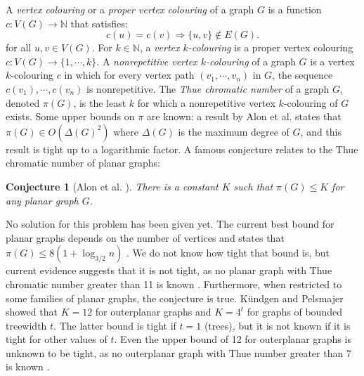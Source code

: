 \documentclass{patmorin}
\newcommand{\naturals}{\mathbb{N}}
\newtheorem{conjecture}[theorem]{Conjecture}
\begin{document}
A \emph{vertex colouring} or a \emph{proper vertex colouring} of a graph $G$ is a function $c: V(G) \rightarrow \naturals$ that satisfies:
\begin{equation}
c(u) = c(v) \Rightarrow \{u,v\} \notin E(G).
\label{eqn:propervcolouring}
\end{equation}
for all $u,v \in V(G)$. For $k \in \naturals$, a \emph{vertex $k$-colouring} is a proper vertex colouring $c : V(G) \rightarrow \{1,\cdots,k\}$.
A \emph{nonrepetitive vertex $k$-colouring} of a graph $G$ is a vertex $k$-colouring $c$ in which for every vertex path $(v_1,\cdots,v_n)$ in $G$, the sequence $c(v_1),\cdots, c(v_n)$ is nonrepetitive. The \emph{Thue chromatic number} of a graph $G$, denoted $\pi(G)$, is the least $k$ for which a nonrepetitive vertex $k$-colouring of $G$ exists. Some upper bounds on $\pi$ are known: a result by Alon et al.\cite{alon2002nonrepetitive} states that $\pi(G) \in O(\Delta(G)^2)$ where $\Delta(G)$ is the maximum degree of $G$, and this result is tight up to a logarithmic factor.  A famous conjecture relates to the Thue chromatic number of planar graphs:
\begin{conjecture}[Alon et al. \cite{alon2002nonrepetitive}]
 There is a constant $K$ such that $\pi(G) \leq K$ for any planar graph $G$.
 \label{conj:planarConstant}
\end{conjecture}
No solution for this problem has been given yet. The current best bound for planar graphs depends on the number of vertices and states that $\pi(G) \leq 8(1+\log_{3/2}n)$ \cite{dujmovic2012planarlogn}. We do not know how tight that bound is, but current evidence suggests that it is not tight, as no planar graph with Thue chromatic number greater than 11 is known \cite{dujmovic2012planarlogn}. Furthermore, when restricted to some families of planar graphs, the conjecture is true.  K{\"u}ndgen and Pelsmajer \cite{kundgen2008nonrepetitive} showed that $K=12$ for outerplanar graphs and $K=4^t$ for graphs of bounded treewidth $t$. The latter bound is tight if $t=1$ (trees), but it is not known if it is tight for other values of $t$. Even the upper bound of 12 for outerplanar graphs is unknown to be tight, as no outerplanar graph with Thue number greater than 7 is known \cite{barat2007square}.
\end{document}
